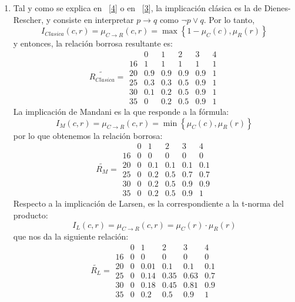 \documentclass[
]{article}
\begin{document}
\begin{enumerate}
\def\labelenumi{\arabic{enumi}.}
\item
  Tal y como se explica en
  ~{[}\protect\hyperlink{ref-BotiaPalmaImplicaciones}{4}{]} o en
  ~{[}\protect\hyperlink{ref-PalmaLogicaBorrosa}{3}{]}, la implicación
  clásica es la de Dienes-Rescher, y consiste en interpretar
  \(p\rightarrow q\) como \(\neg p\lor q\). Por lo tanto,
  \[I_{Clasica}\left(c,r\right)=\mu_{C\rightarrow R}\left(c,r\right)=\max\left\{ 1-\mu_{C}\left(c\right),\mu_{R}\left(r\right)\right\} \]
  y entonces, la relación borrosa resultante es:
  \[\widetilde{R_{Clasica}}=\begin{array}{cccccc}
   & 0 & 1 & 2 & 3 & 4\\
  16 & 1 & 1 & 1 & 1 & 1\\
  20 & 0.9 & 0.9 & 0.9 & 0.9 & 1\\
  25 & 0.3 & 0.3 & 0.5 & 0.9 & 1\\
  30 & 0.1 & 0.2 & 0.5 & 0.9 & 1\\
  35 & 0 & 0.2 & 0.5 & 0.9 & 1
  \end{array}\] La implicación de Mandani es la que responde a la
  fórmula:
  \[I_{M}\left(c,r\right)=\mu_{C\rightarrow R}\left(c,r\right)=\min\left\{ \mu_{C}\left(c\right),\mu_{R}\left(r\right)\right\} \]
  por lo que obtenemos la relación borrosa:
  \[\widetilde{R_{M}}=\begin{array}{cccccc}
   & 0 & 1 & 2 & 3 & 4\\
  16 & 0 & 0 & 0 & 0 & 0\\
  20 & 0 & 0.1 & 0.1 & 0.1 & 0.1\\
  25 & 0 & 0.2 & 0.5 & 0.7 & 0.7\\
  30 & 0 & 0.2 & 0.5 & 0.9 & 0.9\\
  35 & 0 & 0.2 & 0.5 & 0.9 & 1
  \end{array}\] Respecto a la implicación de Larsen, es la
  correspondiente a la t-norma del producto:
  \[I_{L}\left(c,r\right)=\mu_{C\rightarrow R}\left(c,r\right)=\mu_{C}\left(r\right)\cdot\mu_{R}\left(r\right)\]
  que nos da la siguiente relación:
  \[\widetilde{R_{L}}=\begin{array}{cccccc}
   & 0 & 1 & 2 & 3 & 4\\
  16 & 0 & 0 & 0 & 0 & 0\\
  20 & 0 & 0.01 & 0.1 & 0.1 & 0.1\\
  25 & 0 & 0.14 & 0.35 & 0.63 & 0.7\\
  30 & 0 & 0.18 & 0.45 & 0.81 & 0.9\\
  35 & 0 & 0.2 & 0.5 & 0.9 & 1

\end{array}\]
\end{enumerate}
\end{document}
